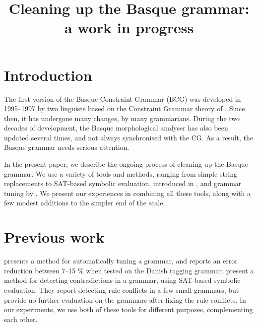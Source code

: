 \documentclass[11pt]{article}
\title{Cleaning up the Basque grammar: a work in progress}
\date{}
\begin{document}
\maketitle



\section{Introduction}

The first version of the Basque Constraint Grammar (BCG) was developed in 1995--1997 by two linguists \cite{aduriz1997euscg} based on the Constraint Grammar theory of .
Since then, it has undergone many changes, by many grammarians.
During the two decades of development, the Basque morphological analyser has also been updated several times, and not always synchronised with the CG. As a result, the Basque grammar needs serious attention.

In the present paper, we describe the ongoing process of cleaning up the Basque grammar. We use a variety of tools and methods, ranging from simple string replacements to SAT-based symbolic evaluation, introduced in , and grammar tuning by . We present our experiences in combining all these tools, along with a few modest additions to the simpler end of the scale.


\section{Previous work}

 presents a method for automatically tuning a grammar, and reports an error reduction between 7--15 \% when tested on the Danish tagging grammar.
 present a method for detecting contradictions in a grammar, using SAT-based symbolic evaluation.  They report detecting rule conflicts in a few small grammars, but provide no further evaluation on the grammars after fixing the rule conflicts. 
In our experiments, we use both of these tools for different purposes, complementing each other.
\end{document}
